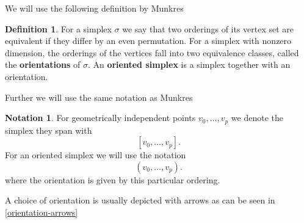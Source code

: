 \documentclass[draft,toc=bib]{scrartcl}
\theoremstyle{plain}
\theoremstyle{definition}
\newtheorem	{definition}[theorem]{Definition}
\newtheorem{notation}[theorem]{Notation}
\theoremstyle{remark}
\begin{document}
We will use the following definition by Munkres \cite[p. 26]{mu} %
\begin{definition}
	For a simplex $\sigma$ we say that two orderings of its vertex set are equivalent if they differ by an even permutation. For a simplex with nonzero dimension, the orderings of the vertices fall into two equivalence classes, called the \textbf{orientations} of $\sigma$. An \textbf{oriented simplex} is a simplex together with an orientation.
\end{definition}
Further we will use the same notation as Munkres \cite[p. 26]{mu}
\begin{notation}
	For geometrically independent points $v_0,\dots,v_p$ we denote the simplex they span with
	\[
	[v_0,\dots,v_p].
	\]
	For an oriented simplex we will use the notation
	\[
	(v_0,\dots,v_p).
	\]
	where the orientation is given by this particular ordering.
\end{notation}

A choice of orientation is usually depicted with arrows as can be seen in \autoref{orientation-arrows}
\end{document}
